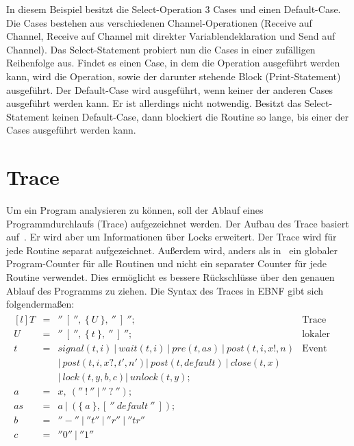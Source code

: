 In diesem Beispiel besitzt die Select-Operation 3 Cases und einen Default-Case.
Die Cases bestehen aus verschiedenen Channel-Operationen (Receive auf Channel, 
Receive auf Channel mit direkter Variablendeklaration und Send auf Channel).
Das Select-Statement probiert nun die Cases in einer zufälligen Reihenfolge 
aus. Findet es einen Case, in dem die Operation ausgeführt werden kann, wird 
die Operation, sowie der darunter stehende Block (Print-Statement) ausgeführt.
Der Default-Case wird ausgeführt, wenn keiner der anderen Cases ausgeführt 
werden kann. Er ist allerdings nicht notwendig. Besitzt das Select-Statement 
keinen Default-Case, dann blockiert die Routine so lange, bis einer der Cases 
ausgeführt werden kann.


\section{Trace}\label{chap:background-sec:trace}
Um ein Program analysieren zu können, soll der Ablauf eines Programmdurchlaufs
(Trace) aufgezeichnet werden. Der Aufbau des Trace basiert auf~\cite{PPDP18}. 
Er wird aber um Informationen 
über Locks erweitert. Der Trace wird für jede Routine
separat aufgezeichnet. Außerdem wird, anders als in~\cite{PPDP18} ein globaler
Program-Counter für alle Routinen und nicht ein separater Counter für jede 
Routine verwendet. Dies ermöglicht es bessere Rückschlüsse über den genauen 
Ablauf des Programms zu ziehen.
Die Syntax des Traces in EBNF gibt sich 
folgendermaßen:
\begin{align*}
  \begin{matrix*}[l]
    T & = & ''\ [\ '',\ \{\ U\ \},\ ''\ ]\ ''; & \text{Trace}\\
    U & = & ''\ [\ '',\ \{\ t\ \},\ ''\ ]\ ''; & \text{lokaler Trace} \\
    t & = & signal(t, i)\ |\ wait(t, i)\ |\ pre(t, as)\ |\ post(t, i, x!, n) & \text{Event}\\
      &   & |\ post(t, i, x?, t', n') |\ post(t, default)\ 
      |\ close(t, x)\  
      & \\
      &   & |\ lock(t, y, b, c) |\ unlock(t, y); & \\
    a & = & x,\ (''\ !\ ''\ |\ ''\ ?\ ''); & \\
    as & = & a\ |\ (\{\ a\ \}, [\ ''\ default\ ''\ ]); & \\
    b & = & ''-''\ |\ ''t''\ |\ ''r''\ |\ ''tr'' & \\
    c & = & ''0''\ |\ ''1''
  \end{matrix*}
\end{align*}
